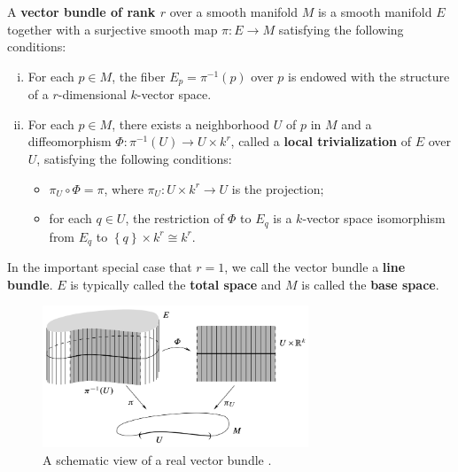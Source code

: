 \documentclass{../../mathnotes}
\begin{document}
\begin{defn}
    A \textbf{vector bundle of rank $r$} over a smooth manifold $M$ is a smooth manifold $E$ together with a surjective
    smooth map $\pi:E\to M$ satisfying the following conditions:
    \begin{enumerate}[(i)]
        \item For each $p\in M$, the fiber $E_p=\pi^{-1}(p)$ over $p$ is endowed with the structure of a $r$-dimensional
            $k$-vector space.
        \item For each $p\in M$, there exists a neighborhood $U$ of $p$ in $M$ and a diffeomorphism $\Phi: \pi^{-1}(U)\to U\times k^r$,
            called a \textbf{local trivialization} of $E$ over $U$, satisfying the following conditions:
            \begin{itemize}
                \item $\pi_U\circ\Phi=\pi$, where $\pi_U:U\times k^r\to U$ is the projection;
                \item for each $q\in U$, the restriction of $\Phi$ to $E_q$ is a $k$-vector space isomorphism from
                    $E_q$ to $\left\{ q \right\}\times k^r\cong k^r$.
            \end{itemize}
    \end{enumerate}
    In the important special case that $r=1$, we call the vector bundle a \textbf{line bundle}. $E$ is typically called
    the \textbf{total space} and $M$ is called the \textbf{base space}.
\end{defn}

\begin{figure}
    \begin{center}
        \includegraphics[width=300px]{vectorbundles_lee.png}
    \end{center}
    \caption{A schematic view of a real vector bundle \cite{lee12}.}
    \label{fig:vector_bundle}
\end{figure}
\end{document}
